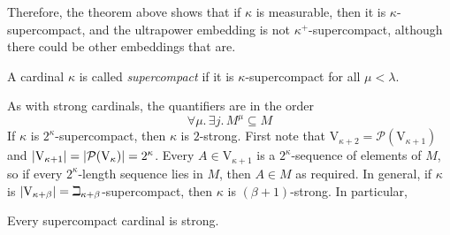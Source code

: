 Therefore, the theorem above shows that if \( \kappa \) is measurable, then it is \( \kappa \)-supercompact, and the ultrapower embedding is not \( \kappa^+ \)-supercompact, although there could be other embeddings that are.
\begin{definition}
    A cardinal \( \kappa \) is called \emph{supercompact} if it is \( \kappa \)-supercompact for all \( \mu < \lambda \).
\end{definition}
As with strong cardinals, the quantifiers are in the order
\[ \forall \mu.\, \exists j.\, M^\mu \subseteq M \]
If \( \kappa \) is \( 2^\kappa \)-supercompact, then \( \kappa \) is \( 2 \)-strong.
First note that \( \mathrm{V}_{\kappa + 2} = \mathcal P(\mathrm{V}_{\kappa + 1}) \) and \( \abs{\mathrm{V}_{\kappa + 1}} = \abs{\mathcal P(\mathrm{V}_\kappa)} = 2^\kappa \).
Every \( A \in \mathrm{V}_{\kappa + 1} \) is a \( 2^\kappa \)-sequence of elements of \( M \), so if every \( 2^\kappa \)-length sequence lies in \( M \), then \( A \in M \) as required.
In general, if \( \kappa \) is \( \abs{\mathrm{V}_{\kappa + \beta}} = \beth_{\kappa + \beta} \)-supercompact, then \( \kappa \) is \( (\beta + 1) \)-strong.
In particular,
\begin{corollary}
    Every supercompact cardinal is strong.
\end{corollary}

